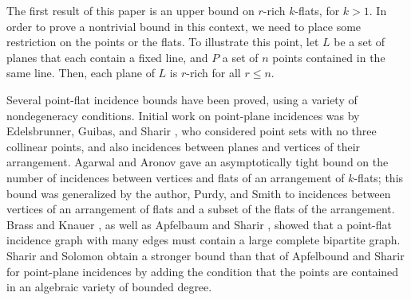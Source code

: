\documentclass{article}
\begin{document}
\begin{comment}
Note that there is an equivalent formulation of Theorem \ref{th:sz-t} in terms of the maximum possible number of incidences between a fixed set of points and lines, where an incidence is a pair of a point and a line such that the point is contained in the line, and bounds of the this type are often called incidence bounds.
\end{comment}

\begin{comment}
Szemer\'edi-Trotter type incidence bounds play a major role in combinatorial geometry, and have numerous applications in other areas of mathematics and computer science.
The surveys and books of Dvir \cite{dvir2012incidence}, Guth \cite{guth2016polynomial}, Tao \cite{tao2013algebraic}, Tao and Vu \cite{tao2006additive}, Elekes \cite{elekes2001sums}, Pach and Sharir \cite{pach2004geometric}, and Matou\v{s}ek \cite{matousek2002lectures}, are all good resources on Szemer\'edi-Trotter type bounds and their applications.
\end{comment}

The first result of this paper is an upper bound on $r$-rich $k$-flats, for $k>1$.
In order to prove a nontrivial bound in this context, we need to place some restriction on the points or the flats.
To illustrate this point, let $L$ be a set of planes that each contain a fixed line, and $P$ a set of $n$ points contained in the same line.
Then, each plane of $L$ is $r$-rich for all $r \leq n$.

Several point-flat incidence bounds have been proved, using a variety of nondegeneracy conditions.
Initial work on point-plane incidences was by Edelsbrunner, Guibas, and Sharir \cite{edelsbrunner1990complexity}, who considered point sets with no three collinear points, and also incidences between planes and vertices of their arrangement.
Agarwal and Aronov \cite{agarwal1992counting} gave an asymptotically tight bound on the number of incidences between vertices and flats of an arrangement of $k$-flats; this bound was generalized by the author, Purdy, and Smith \cite{lund2011bichromatic} to incidences between vertices of an arrangement of flats and a subset of the flats of the arrangement.
Brass and Knauer \cite{brass2003counting}, as well as Apfelbaum and Sharir \cite{apfelbaum2007large}, showed that a point-flat incidence graph with many edges must contain a large complete bipartite graph.
Sharir and Solomon \cite{sharir2016incidences} obtain a stronger bound than that of Apfelbound and Sharir for point-plane incidences by adding the condition that the points are contained in an algebraic variety of bounded degree.
\end{document}
